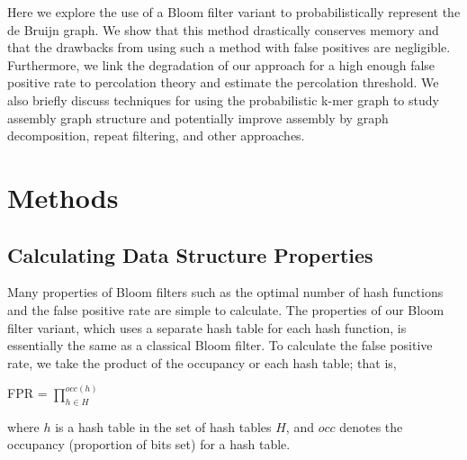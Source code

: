 \documentclass[12pt]{article} \usepackage{simplemargins}
\begin{document}
Here we explore the use of a Bloom filter variant to probabilistically
represent the de Bruijn graph. We show that this method drastically
conserves memory and that the drawbacks from using such a method 
with false positives are negligible. Furthermore, we link the degradation 
of our approach for a high enough false positive rate to percolation 
theory and estimate the percolation threshold. We also briefly
discuss techniques for using the probabilistic k-mer graph to study 
assembly graph structure and potentially improve assembly by 
graph decomposition, repeat filtering, and other approaches.

\section{Methods}


\subsection{Calculating Data Structure Properties}
Many properties of Bloom filters such as the optimal number of hash functions 
and the false positive rate are simple to calculate. The properties 
of our Bloom filter variant, which 
uses a separate hash table for each hash function, is essentially the 
same as a classical Bloom filter. To calculate the false positive rate, we 
take the product of the occupancy or each hash table; that is,
\begin{center}
FPR = $\prod_{h \in H}^{occ(h)}$
\end{center}
where $h$ is a hash table in the set of hash tables $H$, and $occ$ denotes 
the occupancy (proportion of bits set) for a hash table.
\end{document}
